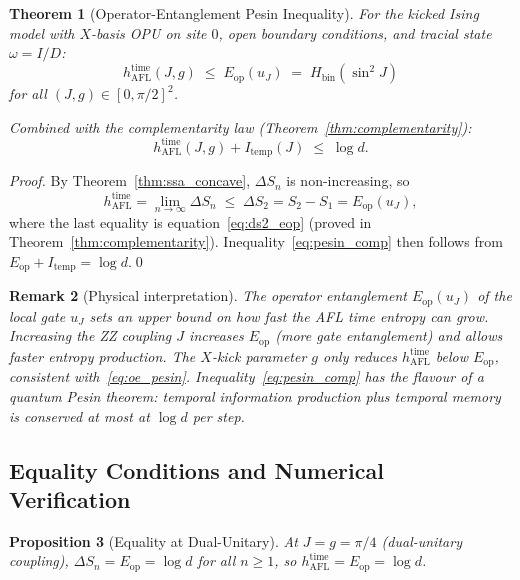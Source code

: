 \documentclass[12pt,a4paper]{article}
\newtheorem{theorem}{Theorem}[section]
\newtheorem{proposition}[theorem]{Proposition}
\newtheorem{remark}[theorem]{Remark}
\begin{document}
\begin{theorem}[Operator-Entanglement Pesin Inequality]\label{thm:oe_pesin}
For the kicked Ising model with $X$-basis OPU on site $0$, open boundary
conditions, and tracial state $\omega = I/D$:
\begin{equation}\label{eq:oe_pesin}
  \boxed{h_\mathrm{AFL}^\mathrm{time}(J,g)
  \;\le\;
  E_\mathrm{op}(u_J) \;=\; H_\mathrm{bin}(\sin^2\!J)}
\end{equation}
for all $(J,g)\in[0,\pi/2]^2$.

Combined with the complementarity law (Theorem~\ref{thm:complementarity}):
\begin{equation}\label{eq:pesin_comp}
  h_\mathrm{AFL}^\mathrm{time}(J,g) + I_\mathrm{temp}(J) \;\le\; \log d.
\end{equation}
\end{theorem}

\begin{proof}
By Theorem~\ref{thm:ssa_concave}, $\Delta S_n$ is non-increasing, so
\[
  h_\mathrm{AFL}^\mathrm{time}
  = \lim_{n\to\infty}\Delta S_n
  \;\le\;
  \Delta S_2 = S_2 - S_1 = E_\mathrm{op}(u_J),
\]
where the last equality is equation~\eqref{eq:ds2_eop} (proved in
Theorem~\ref{thm:complementarity}).
Inequality~\eqref{eq:pesin_comp} then follows from $E_\mathrm{op}+I_\mathrm{temp}=\log d$.\qed
\end{proof}

\begin{remark}[Physical interpretation]
The operator entanglement $E_\mathrm{op}(u_J)$ of the local gate $u_J$
sets an \emph{upper bound} on how fast the AFL time entropy can grow.
Increasing the ZZ coupling $J$ increases $E_\mathrm{op}$ (more gate entanglement)
and allows faster entropy production.  The $X$-kick parameter $g$ only
reduces $h_\mathrm{AFL}^\mathrm{time}$ below $E_\mathrm{op}$, consistent
with~\eqref{eq:oe_pesin}.  Inequality~\eqref{eq:pesin_comp} has the flavour
of a quantum Pesin theorem: temporal information production plus temporal
memory is conserved at most at $\log d$ per step.
\end{remark}

\subsection{Equality Conditions and Numerical Verification}

\begin{proposition}[Equality at Dual-Unitary]\label{prop:du_equality}
At $J=g=\pi/4$ (dual-unitary coupling), $\Delta S_n = E_\mathrm{op}=\log d$
for all $n\ge 1$, so $h_\mathrm{AFL}^\mathrm{time}=E_\mathrm{op}=\log d$.
\end{proposition}
\end{document}
